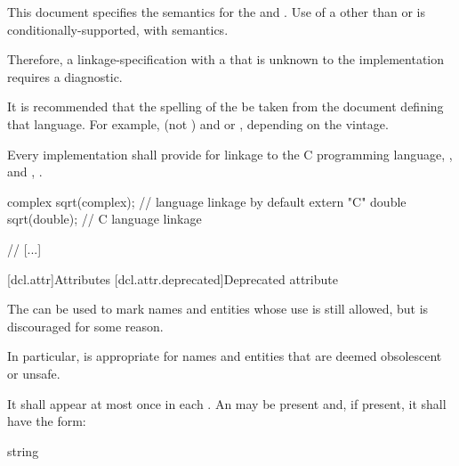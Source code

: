 \documentclass{wg21}
\begin{document}
This document specifies the semantics for the
  and . Use of a
 other than  or  is
conditionally-supported, with  semantics.
\begin{note}
    Therefore, a linkage-specification with a  that
    is unknown to the implementation requires a diagnostic.
\end{note}
\begin{note}
    It is recommended that the spelling of the  be
    taken from the document defining that language. For example, 
    (not ) and  or , depending on
    the vintage.
\end{note}


\pnum
{}%
Every implementation shall provide for linkage to the C programming language,
%
, and \Cpp{}, .
\begin{example}
    \begin{codeblock}
        complex sqrt(complex);          // \Cpp{} language linkage by default
        extern "C" {
            double sqrt(double);          // C language linkage
        }
    \end{codeblock}
\end{example}

// [...]

[dcl.attr]{Attributes}%
[dcl.attr.deprecated]{Deprecated attribute}%

\pnum
The   can be used to mark names and entities
whose use is still allowed, but is discouraged for some reason.
\begin{note}
    In particular,
     is appropriate for names and entities that are deemed obsolescent or
    unsafe.
\end{note}
It shall appear at most once in each . An
 may be present and, if present, it shall have the form:

\begin{ncbnf}
    \terminal{(} string \terminal{)}
\end{ncbnf}
\end{document}
